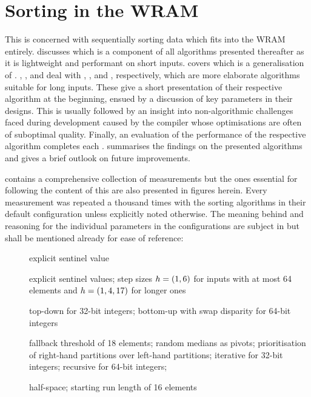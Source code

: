 \chapter[Sorting in the \texorpdfstring{\abb{WRAM}}{WRAM}]{Sorting in the \acs*{WRAM}}
\label{sec:tasklet}

This  is concerned with sequentially sorting data which fits into the \ac{WRAM} entirely.
 discusses \IS{} which is a component of all algorithms presented thereafter as it is lightweight and performant on short inputs.
 covers \ShS{} which is a generalisation of \IS{}.
\hyperref[sec:tasklet:heap]{ }, , and  deal with \HS{}, \QS{}, and \MS{}, respectively, which are more elaborate algorithms suitable for long inputs.
These  give a short presentation of their respective algorithm at the beginning, ensued by a discussion of key parameters in their designs.
This is usually followed by an insight into non-algorithmic challenges faced during development caused by the compiler whose optimisations are often of suboptimal quality.
Finally, an evaluation of the performance of the respective algorithm completes each .
 summarises the findings on the presented algorithms and gives a brief outlook on future improvements.

 contains a comprehensive collection of measurements but the ones essential for following the content of this  are also presented in figures herein.
Every measurement was repeated a thousand times with the sorting algorithms in their default configuration unless explicitly noted otherwise.
The meaning behind and reasoning for the individual parameters in the configurations are subject in  but shall be mentioned already for ease of reference:
\begin{description}
	\item[\IS{}]
	explicit sentinel value

	\item[\ShS{}]
	explicit sentinel values;
	step sizes \(h = \lparen1, 6\rparen\) for inputs with at most 64 elements and \(h = \lparen1, 4, 17\rparen\) for longer ones

	\item[\HS{}]
	top-down for 32-bit integers;
	bottom-up with swap disparity for 64-bit integers

	\item[\QS{}]
	fallback threshold of 18 elements;
	random medians as pivots;
	prioritisation of right-hand partitions over left-hand partitions;
	iterative for 32-bit integers;
	recursive for 64-bit integers;

	\item[\MS{}]
	half-space;
	starting run length of 16 elements
\end{description}

